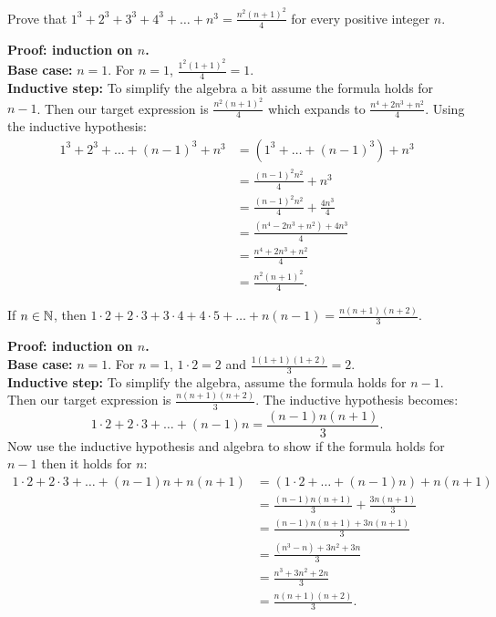 \documentclass{article}
\begin{document}
\begin{problem}
Prove that $1^3 + 2^3 + 3^3 + 4^3 + \ldots + n^3 = \frac{n^2(n + 1)^2}{4}$ for every positive integer $n$.
\end{problem}

\textbf{Proof: induction on $n$.}
\\

\textbf{Base case:} $n = 1$. For $n = 1$, $\frac{1^2(1 + 1)^2}{4} = 1$.
\\

\textbf{Inductive step:} To simplify the algebra a bit assume the formula holds for $n - 1$. Then our target expression is $\frac{n^2(n+1)^2}{4}$ which expands to $\frac{n^4 + 2n^3 + n^2}{4}$. Using the inductive hypothesis:
\begin{align*}
  1^3 + 2^3 + \ldots + (n-1)^3 + n^3 & = (1^3 + \ldots + (n-1)^3) + n^3        \\
                                     & = \frac{(n-1)^2n^2}{4} + n^3            \\
                                     & = \frac{(n-1)^2n^2}{4} + \frac{4n^3}{4} \\
                                     & = \frac{(n^4 - 2n^3 + n^2) + 4n^3}{4}   \\
                                     & = \frac{n^4 + 2n^3 + n^2}{4}            \\
                                     & = \frac{n^2(n+1)^2}{4}.
\end{align*}

\begin{problem}
If $n \in \mathbb{N}$, then $1\cdot 2 + 2\cdot 3 + 3\cdot 4 + 4\cdot 5 + \ldots + n(n-1) = \frac{n(n+1)(n+2)}{3}$.
\end{problem}

\textbf{Proof: induction on $n$.}
\\

\textbf{Base case:} $n = 1$. For $n = 1$, $1\cdot 2 = 2$ and $\frac{1(1+1)(1+2)}{3} = 2$.
\\

\textbf{Inductive step:} To simplify the algebra, assume the formula holds for $n - 1$. Then our target expression is $\frac{n(n+1)(n+2)}{3}$. The inductive hypothesis becomes:
$$1\cdot 2 + 2\cdot 3 + \ldots + (n-1)n = \frac{(n-1)n(n+1)}{3}.$$
Now use the inductive hypothesis and algebra to show if the formula holds for $n-1$ then it holds for $n$:
\begin{align*}
  1\cdot 2 + 2\cdot 3 + \ldots + (n-1)n + n(n+1) & = (1\cdot 2 + \ldots + (n-1)n) + n(n+1)     \\
                                                 & = \frac{(n-1)n(n+1)}{3} + \frac{3n(n+1)}{3} \\
                                                 & = \frac{(n-1)n(n+1) + 3n(n+1)}{3}           \\
                                                 & = \frac{(n^3 - n) + 3n^2 + 3n}{3}           \\
                                                 & = \frac{n^3 + 3n^2 + 2n}{3}                 \\
                                                 & = \frac{n(n+1)(n+2)}{3}.
\end{align*}
\end{document}
